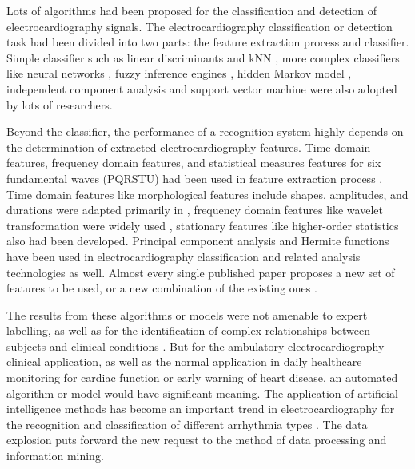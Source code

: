 \documentclass{bmcart}
\begin{document}
Lots of algorithms had been proposed for the classification and detection of electrocardiography signals. 
The electrocardiography classification or detection task had been divided into two parts: the feature extraction process and classifier. 
Simple classifier such as linear discriminants \cite{chaza} and kNN \cite{melgan}, more complex classifiers like neural networks \cite{jiang, olmez, lin, osowski}, fuzzy inference engines \cite{osowski, kundu}, hidden Markov model \cite{andreao, coast}, independent component analysis \cite{zhu} and support vector machine  \cite{melgan, kampoura, khandoker} were also adopted by lots of researchers.  



Beyond the classifier, the performance of a recognition system highly depends on the determination of extracted electrocardiography features. Time domain features, frequency domain features, and statistical measures features for six fundamental waves (PQRSTU) had been used in feature extraction process \cite{chia}. 
Time domain features like morphological features include shapes, amplitudes, and durations were adapted primarily in \cite{jekova, christove, can}, frequency domain features like wavelet transformation were widely used \cite{inan}, \cite{banerjee} stationary features like higher-order statistics also had been developed. 
Principal component analysis \cite{stam} and Hermite functions \cite{lager} have been used in electrocardiography classification and related analysis technologies as well.
Almost every single published paper proposes a new set of features to be used, or a new combination of the existing ones \cite{mar}.


The results from these algorithms or models were not amenable to expert labelling, as well as for the identification of complex relationships between subjects and clinical conditions \cite{clifford}.
But for the ambulatory electrocardiography clinical application, as well as the normal application in daily healthcare monitoring for cardiac function or early warning of heart disease, an automated algorithm or model would have significant meaning.
The application of artificial intelligence methods has become an important trend in electrocardiography for the recognition and classification of different arrhythmia types \cite{clifford}. 
The data explosion puts forward the new request to the method of data processing and information mining.
\end{document}
